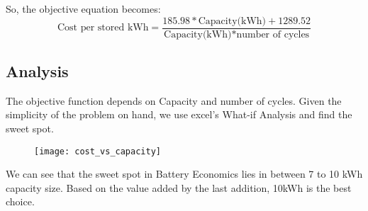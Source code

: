 \documentclass[oneside]{book}
\begin{document}
So, the objective equation becomes:
\[ \text{Cost per stored kWh} = \frac{185.98* \text{Capacity(kWh)} +1289.52}{\text{Capacity(kWh)}*\text{number of cycles}} \]

\subsection{Analysis}
The objective function depends on Capacity and number of cycles. Given the simplicity of the problem on hand, we use excel's What-if Analysis and find the sweet spot.
\begin{figure}[h]
\texttt{[image: cost\_vs\_capacity]}
\end{figure}

We can see that the sweet spot in Battery Economics lies in between 7 to 10 kWh capacity size. Based on the value added by the last addition, 10kWh is the best choice. 
\end{document}
